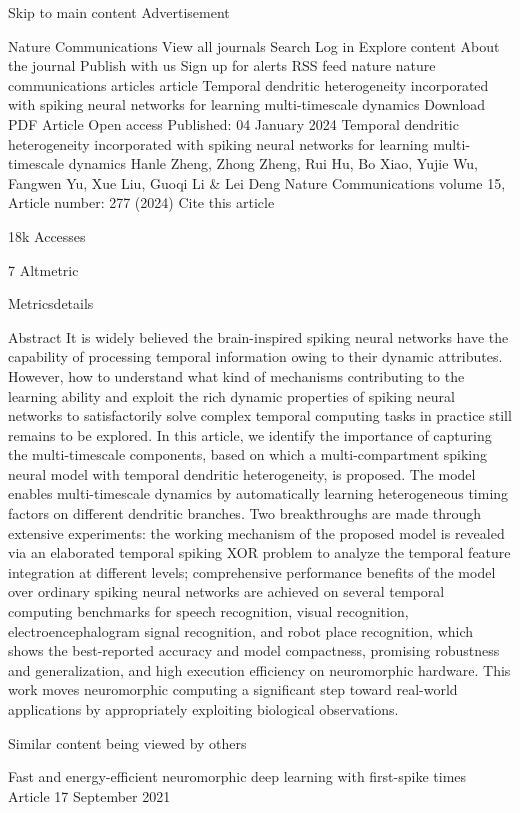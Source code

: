 Skip to main content
Advertisement


Nature Communications
View all journals
Search
Log in
Explore content
About the journal
Publish with us
Sign up for alerts
RSS feed
nature  nature communications  articles  article
Temporal dendritic heterogeneity incorporated with spiking neural networks for learning multi-timescale dynamics
Download PDF
Article
Open access
Published: 04 January 2024
Temporal dendritic heterogeneity incorporated with spiking neural networks for learning multi-timescale dynamics
Hanle Zheng, Zhong Zheng, Rui Hu, Bo Xiao, Yujie Wu, Fangwen Yu, Xue Liu, Guoqi Li & Lei Deng 
Nature Communications volume 15, Article number: 277 (2024) Cite this article

18k Accesses

7 Altmetric

Metricsdetails

Abstract
It is widely believed the brain-inspired spiking neural networks have the capability of processing temporal information owing to their dynamic attributes. However, how to understand what kind of mechanisms contributing to the learning ability and exploit the rich dynamic properties of spiking neural networks to satisfactorily solve complex temporal computing tasks in practice still remains to be explored. In this article, we identify the importance of capturing the multi-timescale components, based on which a multi-compartment spiking neural model with temporal dendritic heterogeneity, is proposed. The model enables multi-timescale dynamics by automatically learning heterogeneous timing factors on different dendritic branches. Two breakthroughs are made through extensive experiments: the working mechanism of the proposed model is revealed via an elaborated temporal spiking XOR problem to analyze the temporal feature integration at different levels; comprehensive performance benefits of the model over ordinary spiking neural networks are achieved on several temporal computing benchmarks for speech recognition, visual recognition, electroencephalogram signal recognition, and robot place recognition, which shows the best-reported accuracy and model compactness, promising robustness and generalization, and high execution efficiency on neuromorphic hardware. This work moves neuromorphic computing a significant step toward real-world applications by appropriately exploiting biological observations.

Similar content being viewed by others

Fast and energy-efficient neuromorphic deep learning with first-spike times
Article 17 September 2021

